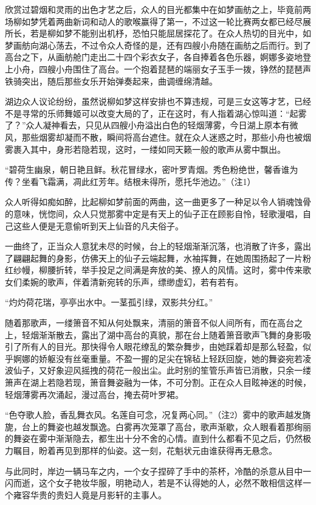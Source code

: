 欣赏过碧烟和灵雨的出色才艺之后，众人的目光都集中在如梦画舫之上，毕竟前两场柳如梦凭着两曲新词和动人的歌喉赢得了第一，不过这一轮比赛两女都已经尽展所长，若是柳如梦不能别出机杼，恐怕只能屈居探花了。在众人热切的目光中，如梦画舫向湖心荡去，不过令众人奇怪的是，还有四艘小舟随在画舫之后而行。到了高台之下，从画舫舱门走出二十四个彩衣女子，各自捧着各色乐器，婀娜多姿地登上小舟，四艘小舟围住了高台。一个抱着琵琶的端丽女子玉手一拨，铮然的琵琶声铁骑突出，随后那些女乐开始弹奏起来，曲调缠绵清越。

湖边众人议论纷纷，虽然说柳如梦这样安排也不算违规，可是三女这等才艺，已经不是寻常的乐师舞姬可以改变大局的了，正在这时，有人指着湖心惊叫道：“起雾了？”众人凝神看去，只见从四艘小舟溢出白色的轻烟薄雾，今日湖上原本有微风，那些烟雾却凝而不散，瞬间将高台遮住。就在众人迷惑之时，那些小舟也被烟雾裹入其中，身形若隐若现，这时，一缕如同天籁一般的歌声从雾中飘出。

“碧荷生幽泉，朝日艳且鲜。秋花冒绿水，密叶罗青烟。秀色粉绝世，馨香谁为传？坐看飞霜满，凋此红芳年。结根未得所，愿托华池边。”（注1）

众人听得如痴如醉，比起柳如梦前面的两曲，这一曲更多了一种足以令人销魂蚀骨的意味，恍惚间，众人只觉那雾中定是有天上的仙子正在顾影自怜，轻歌漫唱，自己这些人便是无意偷听到天上仙音的凡夫俗子。

一曲终了，正当众人意犹未尽的时候，台上的轻烟渐渐沉落，也消散了许多，露出了翩翩起舞的身影，仿佛天上的仙子云端起舞，水袖挥舞，在她周围扬起了一片粉红纱幔，柳腰折转，举手投足之间满是奔放的美、撩人的风情。这时，雾中传来歌女们柔婉的歌声，伴着清新宛转的乐声，缥缈虚幻，若有若有。

“灼灼荷花瑞，亭亭出水中。一茎孤引绿，双影共分红。”

随着那歌声，一缕箫音不知从何处飘来，清丽的箫音不似人间所有，而在高台之上，轻烟渐渐散去，露出了湖中高台的真貌，那在台上随着箫音歌声飞舞的身影吸引了所有人的目光。那快得令人眼花缭乱的繁杂舞步，由她踩着却是那么轻盈，似乎婀娜的娇躯没有丝毫重量。不盈一握的足尖在锦毡上轻跃回旋，她的舞姿宛若凌波仙子，又好象迎风摇拽的荷花一般出尘。此时别的笙管乐声皆已消散，只余一缕箫声在湖上若隐若现，箫音舞姿融为一体，不可分割。正在众人目眩神迷的时候，轻烟薄雾再次涌起，漫过高台，掩去荷叶罗裙。

“色夺歌人脸，香乱舞衣风。名莲自可念，况复两心同。”（注2）雾中的歌声越发旖旎，台上的舞姿也越发飘逸。白雾再次笼罩了高台，歌声渐歇，众人眼看着那绚丽的舞姿在雾中渐渐隐去，都生出十分不舍的心情。直到什么都看不见之后，仍然极力瞩目，盼着再见到那样的仙姿。这一刻，花魁状元由谁获得再无悬念。

与此同时，岸边一辆马车之内，一个女子捏碎了手中的茶杯，冷酷的杀意从目中一闪而逝，这个女子艳妆华服，明艳动人，若是不认得她的人，必然不敢相信这样一个雍容华贵的贵妇人竟是月影轩的主事人。

